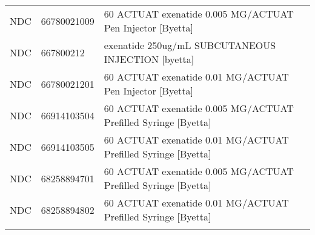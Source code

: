 \begin{longtable}{p{}p{}p{}}
  NDC & 66780021009 & 60 ACTUAT exenatide 0.005 MG/ACTUAT Pen Injector [Byetta] \\ 
  NDC & 667800212 & exenatide 250ug/mL SUBCUTANEOUS INJECTION [byetta] \\ 
  NDC & 66780021201 & 60 ACTUAT exenatide 0.01 MG/ACTUAT Pen Injector [Byetta] \\ 
  NDC & 66914103504 & 60 ACTUAT exenatide 0.005 MG/ACTUAT Prefilled Syringe [Byetta] \\ 
  NDC & 66914103505 & 60 ACTUAT exenatide 0.01 MG/ACTUAT Prefilled Syringe [Byetta] \\ 
  NDC & 68258894701 & 60 ACTUAT exenatide 0.005 MG/ACTUAT Prefilled Syringe [Byetta] \\ 
  NDC & 68258894802 & 60 ACTUAT exenatide 0.01 MG/ACTUAT Prefilled Syringe [Byetta] \\ 
  \hline
\label{tab:codes_glp1}
\end{longtable}
